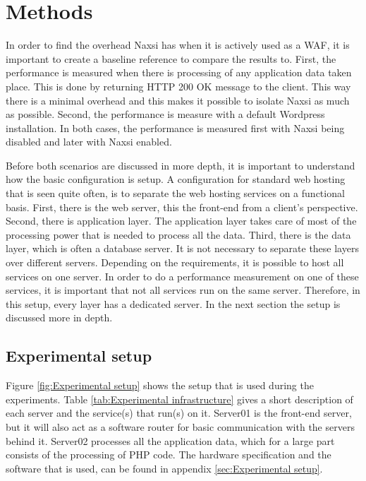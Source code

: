 \documentclass[Methods]{subfiles}
\begin{document}
\section{Methods}
\label{sec:Methods}

In order to find the overhead Naxsi has when it is actively used as a \ac{WAF}, it is important to create a baseline reference to compare the results to. First, the performance is measured when there is processing of any application data taken place. This is done by returning HTTP 200 OK message to the client. This way there is a minimal overhead and this makes it possible to isolate Naxsi as much as possible. Second, the performance is measure with a default Wordpress installation. In both cases, the performance is measured first with Naxsi being disabled and later with Naxsi enabled.

Before both scenarios are discussed in more depth, it is important to understand how the basic configuration is setup. A configuration for standard web hosting that is seen quite often, is to separate the web hosting services on a functional basis. First, there is the web server, this the front-end from a client's perspective. Second, there is application layer. The application layer takes care of most of the processing power that is needed to process all the data. Third, there is the data layer, which is often a database server. It is not necessary to separate these layers over different servers. Depending on the requirements, it is possible to host all services on one server. In order to do a performance measurement on one of these services, it is important that not all services run on the same server. Therefore, in this setup, every layer has a dedicated server. In the next section the setup is discussed more in depth.

\subsection{Experimental setup}

Figure \ref{fig:Experimental setup} shows the setup that is used during the experiments. Table \ref{tab:Experimental infrastructure} gives a short description of each server and the service(s) that run(s) on it. Server01 is the front-end server, but it will also act as a software router for basic communication with the servers behind it. Server02 processes all the application data, which for a large part consists of the processing of PHP code. The hardware specification and the software that is used, can be found in appendix \ref{sec:Experimental setup}.
\end{document}
